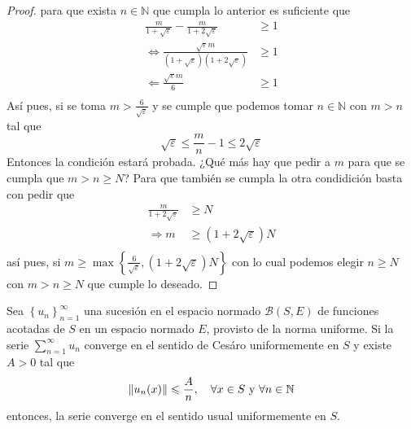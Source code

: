 \documentclass[12pt]{report}
\newcounter{it}
\theoremstyle{largebreak}
\renewcommand{\leq}{\ensuremath{\leqslant}}
\renewcommand{\geq}{\ensuremath{\geqslant}}
\newcommand\norm[1]{\ensuremath{\|#1\|}}
\begin{document}
\begin{proof}
        para que exista $n\in\mathbb{N}$ que cumpla lo anterior es suficiente que
        \begin{equation*}
            \begin{split}
                \frac{m}{1+\sqrt{\varepsilon}}-\frac{m}{1+2\sqrt{\varepsilon}}&\geq 1\\
                \iff \frac{\sqrt{\varepsilon}m}{(1+\sqrt{\varepsilon})(1+2\sqrt{\varepsilon})}&\geq 1\\
                \Leftarrow \frac{\sqrt{\varepsilon}m}{6}&\geq 1\\
            \end{split}
        \end{equation*}
        Así pues, si se toma $m>\frac{6}{\sqrt{\varepsilon}}$ y se cumple que podemos tomar $n\in\mathbb{N}$ con $m>n$ tal que
        \begin{equation*}
            \sqrt{\varepsilon}\leq\frac{m}{n}-1\leq2\sqrt{\varepsilon}
        \end{equation*}
        Entonces la condición estará probada. ¿Qué más hay que pedir a $m$ para que se cumpla que $m>n\geq N$? Para que también se cumpla la otra condidición basta con pedir que 
        \begin{equation*}
            \begin{split}
                \frac{m}{1+2\sqrt{\varepsilon}}&\geq N\\
                \Rightarrow m&\geq(1+2\sqrt{\varepsilon})N\\
            \end{split}
        \end{equation*}
        así pues, si $m\geq\max\left\{\frac{6}{\sqrt{\varepsilon}},(1+2\sqrt{\varepsilon})N \right\}$ con lo cual podemos elegir $n\geq N$ con $m>n\geq N$ que cumple lo deseado.
    \end{proof}

    \begin{cor}
        Sea $\left\{u_n \right\}_{ n=1}^\infty$ una sucesión en el espacio normado $\mathcal{B}(S,E)$ de funciones acotadas de $S$ en un espacio normado $E$, provisto de la norma uniforme. Si la serie $\sum_{ n=1}^\infty u_n$ converge en el sentido de Cesáro uniformemente en $S$ y existe $A>0$ tal que
        \begin{equation*}
            \norm{u_n(x)}\leq\frac{A}{n},\quad\forall x\in S \textup{ y }\forall n\in\mathbb{N}
        \end{equation*}
        entonces, la serie converge en el sentido usual uniformemente en $S$.
    \end{cor}
\end{document}
